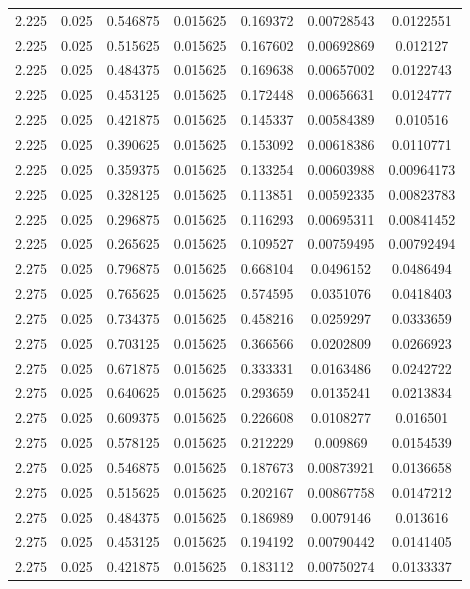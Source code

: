 \begin{flushleft}
\begin{longtable}{ccccccc}
2.225 & 0.025 & 0.546875 & 0.015625 & 0.169372 & 0.00728543 & 0.0122551  \\ 
2.225 & 0.025 & 0.515625 & 0.015625 & 0.167602 & 0.00692869 & 0.012127  \\ 
2.225 & 0.025 & 0.484375 & 0.015625 & 0.169638 & 0.00657002 & 0.0122743  \\ 
2.225 & 0.025 & 0.453125 & 0.015625 & 0.172448 & 0.00656631 & 0.0124777  \\ 
2.225 & 0.025 & 0.421875 & 0.015625 & 0.145337 & 0.00584389 & 0.010516  \\ 
2.225 & 0.025 & 0.390625 & 0.015625 & 0.153092 & 0.00618386 & 0.0110771  \\ 
2.225 & 0.025 & 0.359375 & 0.015625 & 0.133254 & 0.00603988 & 0.00964173  \\ 
2.225 & 0.025 & 0.328125 & 0.015625 & 0.113851 & 0.00592335 & 0.00823783  \\ 
2.225 & 0.025 & 0.296875 & 0.015625 & 0.116293 & 0.00695311 & 0.00841452  \\ 
2.225 & 0.025 & 0.265625 & 0.015625 & 0.109527 & 0.00759495 & 0.00792494  \\ 
2.275 & 0.025 & 0.796875 & 0.015625 & 0.668104 & 0.0496152 & 0.0486494  \\ 
2.275 & 0.025 & 0.765625 & 0.015625 & 0.574595 & 0.0351076 & 0.0418403  \\ 
2.275 & 0.025 & 0.734375 & 0.015625 & 0.458216 & 0.0259297 & 0.0333659  \\ 
2.275 & 0.025 & 0.703125 & 0.015625 & 0.366566 & 0.0202809 & 0.0266923  \\ 
2.275 & 0.025 & 0.671875 & 0.015625 & 0.333331 & 0.0163486 & 0.0242722  \\ 
2.275 & 0.025 & 0.640625 & 0.015625 & 0.293659 & 0.0135241 & 0.0213834  \\ 
2.275 & 0.025 & 0.609375 & 0.015625 & 0.226608 & 0.0108277 & 0.016501  \\ 
2.275 & 0.025 & 0.578125 & 0.015625 & 0.212229 & 0.009869 & 0.0154539  \\ 
2.275 & 0.025 & 0.546875 & 0.015625 & 0.187673 & 0.00873921 & 0.0136658  \\ 
2.275 & 0.025 & 0.515625 & 0.015625 & 0.202167 & 0.00867758 & 0.0147212  \\ 
2.275 & 0.025 & 0.484375 & 0.015625 & 0.186989 & 0.0079146 & 0.013616  \\ 
2.275 & 0.025 & 0.453125 & 0.015625 & 0.194192 & 0.00790442 & 0.0141405  \\ 
2.275 & 0.025 & 0.421875 & 0.015625 & 0.183112 & 0.00750274 & 0.0133337  \\ 

\end{longtable}
\end{flushleft}
